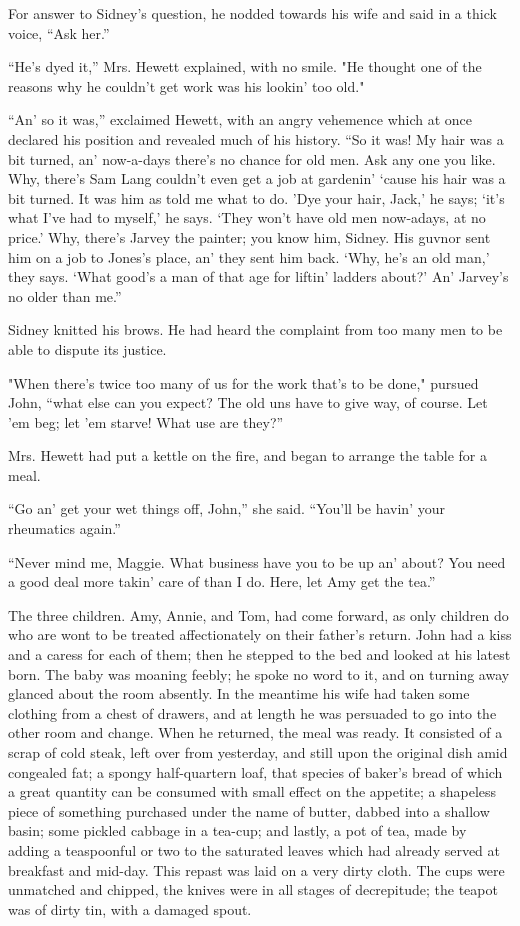 For answer to Sidney's question, he nodded towards his wife and said in
a thick voice, ``Ask her.''

``He's dyed it,'' Mrs. Hewett explained, with no smile. "He thought one
of the {\protect\hypertarget{47}{}{}}reasons why he couldn't get work
was his lookin' too old."

``An' so it was,'' exclaimed Hewett, with an angry vehemence which at
once declared his position and revealed much of his history. ``So it
was! My hair was a bit turned, an' now-a-days there's no chance for old
men. Ask any one you like. Why, there's Sam Lang couldn't even get a job
at gardenin' `cause his hair was a bit turned. It was him as told me
what to do. 'Dye your hair, Jack,' he says; `it's what I've had to
myself,' he says. `They won't have old men now-adays, at no price.' Why,
there's Jarvey the painter; you know him, Sidney. His guvnor sent him on
a job to Jones's place, an' they sent him back. `Why, he's an old man,'
they says. `What good's a man of that age for liftin' ladders about?'
An' Jarvey's no older than me.''

Sidney knitted his brows. He had heard the complaint from too many men
to be able to dispute its justice.

"When there's twice too many of us for {\protect\hypertarget{48}{}{}}the
work that's to be done," pursued John, ``what else can you expect? The
old uns have to give way, of course. Let 'em beg; let 'em starve! What
use are they?''

Mrs. Hewett had put a kettle on the fire, and began to arrange the table
for a meal.

``Go an' get your wet things off, John,'' she said. ``You'll be havin'
your rheumatics again.''

``Never mind me, Maggie. What business have you to be up an' about? You
need a good deal more takin' care of than I do. Here, let Amy get the
tea.''

The three children. Amy, Annie, and Tom, had come forward, as only
children do who are wont to be treated affectionately on their father's
return. John had a kiss and a caress for each of them; then he stepped
to the bed and looked at his latest born. The baby was moaning feebly;
he spoke no word to it, and on turning away glanced about the room
absently. In the meantime his wife had taken some clothing from a chest
of drawers, and at length he was persuaded to
{\protect\hypertarget{49}{}{}}go into the other room and change. When he
returned, the meal was ready. It consisted of a scrap of cold steak,
left over from yesterday, and still upon the original dish amid
congealed fat; a spongy half-quartern loaf, that species of baker's
bread of which a great quantity can be consumed with small effect on the
appetite; a shapeless piece of something purchased under the name of
butter, dabbed into a shallow basin; some pickled cabbage in a tea-cup;
and lastly, a pot of tea, made by adding a teaspoonful or two to the
saturated leaves which had already served at breakfast and mid-day. This
repast was laid on a very dirty cloth. The cups were unmatched and
chipped, the knives were in all stages of decrepitude; the teapot was of
dirty tin, with a damaged spout.

